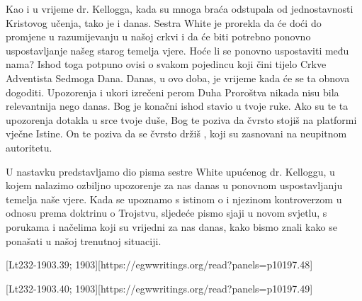 Kao i u vrijeme dr. Kellogga, kada su mnoga braća odstupala od jednostavnosti Kristovog učenja, tako je i danas. Sestra White je prorekla da će doći do promjene u razumijevanju  u našoj crkvi i da će biti potrebno ponovno uspostavljanje našeg starog temelja vjere. Hoće li se  ponovno uspostaviti među nama? Ishod toga potpuno ovisi o svakom pojedincu koji čini tijelo Crkve Adventista Sedmoga Dana. Danas, u ovo doba, je vrijeme kada će se ta obnova dogoditi. Upozorenja i ukori izrečeni perom Duha Proroštva nikada nisu bila relevantnija nego danas. Bog je konačni ishod stavio u tvoje ruke. Ako su te ta upozorenja dotakla u srce tvoje duše, Bog te poziva da čvrsto stojiš na platformi vječne Istine. On te poziva da se čvrsto držiš , koji su zasnovani na neupitnom autoritetu.

U nastavku predstavljamo dio pisma sestre White upućenog dr. Kelloggu, u kojem nalazimo ozbiljno upozorenje za nas danas u ponovnom uspostavljanju temelja naše vjere. Kada se upoznamo s istinom o  i njezinom kontroverzom u odnosu prema doktrinu o Trojstvu, sljedeće pismo sjaji u novom svjetlu, s porukama i načelima koji su vrijedni za nas danas, kako bismo znali kako se ponašati u našoj trenutnoj situaciji.


[Lt232-1903.39; 1903][https://egwwritings.org/read?panels=p10197.48]

[Lt232-1903.40; 1903][https://egwwritings.org/read?panels=p10197.49]

